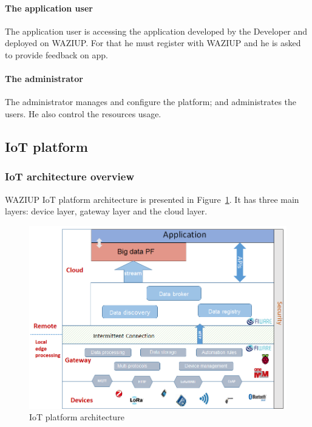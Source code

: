 \paragraph{The application user}
The application user is accessing the application developed by the Developer and deployed on WAZIUP. For that he must register with WAZIUP and he is asked to provide feedback on app. 

\paragraph{The administrator}
The administrator manages and configure the platform; and administrates the users. He also control the resources usage. 

\subsection{IoT platform}

\subsubsection{IoT architecture overview}

WAZIUP IoT platform architecture is presented in Figure~\ref{fig:iotarchi}.
It has three main layers: device layer, gateway layer and the cloud layer.

\begin{figure}[h]
\centering
\includegraphics[width=\textwidth]{figs/iotarchi.png}
\caption{IoT platform architecture}
\label{fig:iotarchi}
\end{figure}

